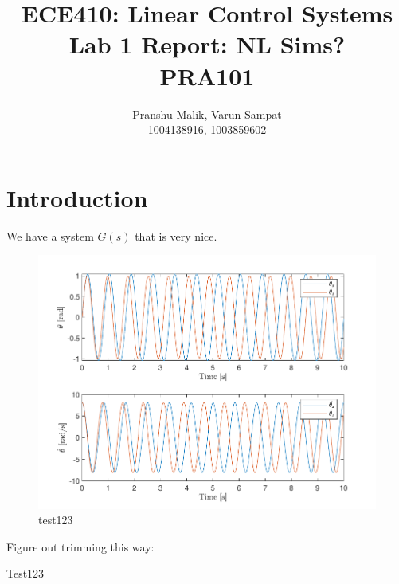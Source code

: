 \documentclass[10pt]{article}
\date{}
\begin{document}
\title{\textbf{\Large{\textsc{ECE410:} Linear Control Systems}} \\ \Large{Lab 1 Report: NL Sims?} \\ \textbf{\small{PRA101}}\vspace{-0.3cm}}
\author{Pranshu Malik, Varun Sampat \\ \footnotesize{1004138916}, \footnotesize{1003859602}\vspace{-3cm}}

\maketitle

\section{Introduction}
We have a system $G(s)$ that is very nice.

\begin{figure}[h]
 \centering
 \includegraphics[clip, scale=0.7, trim=0.5cm 11cm 0.5cm 11cm, width=1.00\textwidth]{X_0_1_state_evolution.pdf}
 \caption{test123}
 \label{figure:test123}
\end{figure}

Figure out trimming this way:
\newpage
{}

Test123
\end{document}
